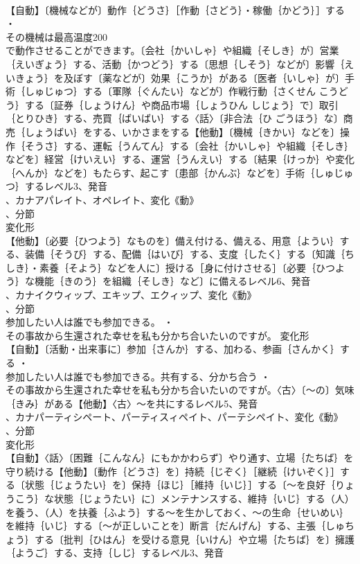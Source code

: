 \documentclass[8pt]{extreport}
\begin{document}
\begin{CJK}{UTF8}{min}
\\	【自動】〔機械などが〕動作｛どうさ｝［作動｛さどう｝・稼働｛かどう｝］する ・
\\	その機械は最高温度200
\\	で動作させることができます。〔会社｛かいしゃ｝や組織｛そしき｝が〕営業｛えいぎょう｝する、活動｛かつどう｝する〔思想｛しそう｝などが〕影響｛えいきょう｝を及ぼす〔薬などが〕効果｛こうか｝がある〔医者｛いしゃ｝が〕手術｛しゅじゅつ｝する〔軍隊｛ぐんたい｝などが〕作戦行動｛さくせん こうどう｝する〔証券｛しょうけん｝や商品市場｛しょうひん しじょう｝で〕取引｛とりひき｝する、売買｛ばいばい｝する〈話〉〔非合法｛ひ ごうほう｝な〕商売｛しょうばい｝をする、いかさまをする【他動】〔機械｛きかい｝などを〕操作｛そうさ｝する、運転｛うんてん｝する〔会社｛かいしゃ｝や組織｛そしき｝などを〕経営｛けいえい｝する、運営｛うんえい｝する〔結果｛けっか｝や変化｛へんか｝などを〕もたらす、起こす〔患部｛かんぶ｝などを〕手術｛しゅじゅつ｝するレベル3、発音
\\	、カナアパレイト、オペレイト、変化《動》
\\	、分節
\\	変化形 
\\	【他動】〔必要｛ひつよう｝なものを〕備え付ける、備える、用意｛ようい｝する、装備｛そうび｝する、配備｛はいび｝する、支度｛したく｝する〔知識｛ちしき｝・素養｛そよう｝などを人に〕授ける［身に付けさせる］〔必要｛ひつよう｝な機能｛きのう｝を組織｛そしき｝など〕に備えるレベル6、発音
\\	、カナイクウィップ、エキップ、エクィップ、変化《動》
\\	、分節
\\	参加したい人は誰でも参加できる。 ・
\\	その事故から生還された幸せを私も分かち合いたいのですが。	変化形 
\\	【自動】〔活動・出来事に〕参加｛さんか｝する、加わる、参画｛さんかく｝する ・
\\	参加したい人は誰でも参加できる。共有する、分かち合う ・
\\	その事故から生還された幸せを私も分かち合いたいのですが。〈古〉〔～の〕気味｛きみ｝がある【他動】〈古〉～を共にするレベル5、発音
\\	、カナパーティシペート、パーティスィペイト、パーテシペイト、変化《動》
\\	、分節
\\	変化形 
\\	【自動】〈話〉〔困難｛こんなん｝にもかかわらず〕やり通す、立場｛たちば｝を守り続ける【他動】〔動作｛どうさ｝を〕持続｛じぞく｝［継続｛けいぞく｝］する〔状態｛じょうたい｝を〕保持｛ほじ｝［維持｛いじ｝］する〔～を良好｛りょうこう｝な状態｛じょうたい｝に〕メンテナンスする、維持｛いじ｝する（人）を養う、（人）を扶養｛ふよう｝する～を生かしておく、～の生命｛せいめい｝を維持｛いじ｝する〔～が正しいことを〕断言｛だんげん｝する、主張｛しゅちょう｝する〔批判｛ひはん｝を受ける意見｛いけん｝や立場｛たちば｝を〕擁護｛ようご｝する、支持｛しじ｝するレベル3、発音

\end{CJK}
\end{document}

